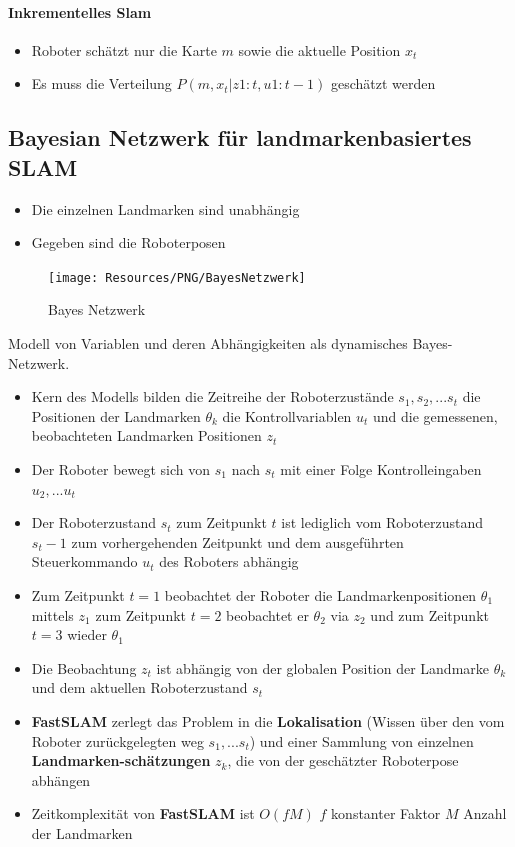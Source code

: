\paragraph{Inkrementelles Slam}
\begin{itemize}
	\item Roboter schätzt nur die Karte $m$ sowie die aktuelle Position $x_t$
	\item Es muss die Verteilung $P(m, x_t | z1:t, u1:t-1)$ geschätzt werden
\end{itemize}

\subsection{Bayesian Netzwerk für landmarkenbasiertes SLAM}
\begin{itemize}
	\item Die einzelnen Landmarken sind unabhängig
	\item Gegeben sind die Roboterposen
\end{itemize}
\begin{figure}[H]
	\begin{center}
		\texttt{[image: Resources/PNG/BayesNetzwerk]}
		\caption{Bayes Netzwerk}
		\label{fig:PNG/BayesNetzwerk}
	\end{center}
\end{figure}
Modell von Variablen und deren Abhängigkeiten als dynamisches Bayes-Netzwerk.
\begin{itemize}
	\item Kern des Modells bilden die
		\subitem Zeitreihe der Roboterzustände $s_1, s_2, ... s_t$
		\subitem die Positionen der Landmarken $\theta_k$
		\subitem die Kontrollvariablen $u_t$
		\subitem und die gemessenen, beobachteten Landmarken Positionen $z_t$
	\item Der Roboter bewegt sich von $s_1$ nach $s_t$ mit einer Folge
		Kontrolleingaben $u_2, ... u_t$
	\item Der Roboterzustand $s_t$ zum Zeitpunkt $t$ ist lediglich vom
		Roboterzustand $s_t-1$ zum vorhergehenden Zeitpunkt und dem ausgeführten
		Steuerkommando $u_t$ des Roboters abhängig
	\item Zum Zeitpunkt $t = 1$ beobachtet der Roboter die Landmarkenpositionen
		$\theta_1$ mittels $z_1$ zum Zeitpunkt $t = 2$ beobachtet er $\theta_2$ via
		$z_2$ und zum Zeitpunkt $t = 3$ wieder $\theta_1$
	\item Die Beobachtung $z_t$ ist abhängig von der globalen Position der
		Landmarke $\theta_k$ und dem aktuellen Roboterzustand $s_t$
	\item \textbf{FastSLAM} zerlegt das Problem
		\subitem in die \textbf{Lokalisation} (Wissen über den vom Roboter
			zurückgelegten weg  $s_1, ... s_t$)
		\subitem und einer Sammlung von einzelnen \textbf{Landmarken-schätzungen}
			$z_k$, die von der geschätzter Roboterpose abhängen
	\item Zeitkomplexität von \textbf{FastSLAM} ist $O(f M)$
		\subitem $f$ konstanter Faktor
		\subitem $M$ Anzahl der Landmarken
\end{itemize}

